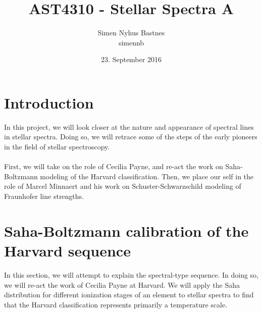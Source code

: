 \documentclass{article}
\title{AST4310 - Stellar Spectra A}
\author{Simen Nyhus Bastnes\\simennb}
\date{23. September 2016}
\newcommand\redrum[1]{\textcolor{red}{\textbf{#1}}}
\begin{document}
\maketitle

\section{Introduction}\label{introduction}
In this project, we will look closer at the nature and appearance of spectral lines in stellar spectra. Doing so, we will retrace some of the steps of the early pioneers in the field of stellar spectroscopy.\\\\
First, we will take on the role of Cecilia Payne, and re-act the work on Saha-Boltzmann modeling of the Harvard classification. Then, we place our self in the role of Marcel Minnaert and his work on Schuster-Schwarzschild modeling of Fraunhofer line strengths.
\section{Saha-Boltzmann calibration of the Harvard sequence}
In this section, we will attempt to explain the spectral-type sequence. In doing so, we will re-act the work of Cecilia Payne at Harvard. We will apply the Saha distribution for different ionization stages of an element to stellar spectra to find that the Harvard classification represents primarily a temperature scale.%
\end{document}
